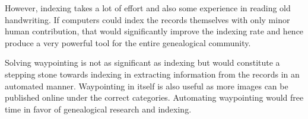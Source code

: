 However, indexing takes a lot of effort and also some experience in reading old handwriting. If computers could index the records themselves with only minor human contribution, that would significantly improve the indexing rate and hence produce a very powerful tool for the entire genealogical community.

Solving waypointing is not as significant as indexing but would constitute a stepping stone towards indexing in extracting information from the records in an automated manner.
Waypointing in itself is also useful as more images can be published online under the correct categories. Automating waypointing would free time in favor of genealogical research and indexing.
